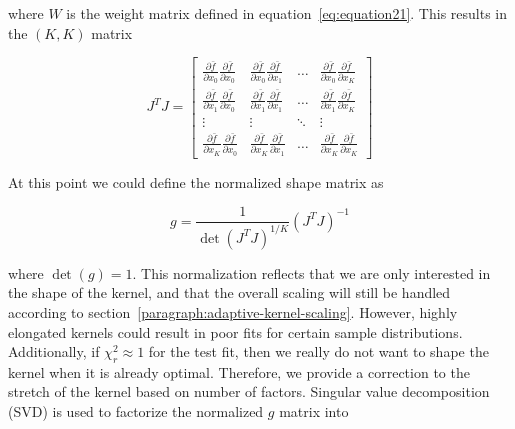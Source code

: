 where $W$ is the weight matrix defined in equation~\ref{eq:equation21}.
This results in the $(K, K)$ matrix

\begin{equation}
    J^T J =
        \begin{bmatrix}
            \frac{\partial \bar{f}}{\partial x_0}
            \frac{\partial \bar{f}}{\partial x_0} &
            \frac{\partial \bar{f}}{\partial x_0}
            \frac{\partial \bar{f}}{\partial x_1} &
            \dots &
            \frac{\partial \bar{f}}{\partial x_0}
            \frac{\partial \bar{f}}{\partial x_K} \\
            \frac{\partial \bar{f}}{\partial x_1}
            \frac{\partial \bar{f}}{\partial x_0} &
            \frac{\partial \bar{f}}{\partial x_1}
            \frac{\partial \bar{f}}{\partial x_1} &
            \dots &
            \frac{\partial \bar{f}}{\partial x_1}
            \frac{\partial \bar{f}}{\partial x_K} \\
            \vdots & \vdots & \ddots & \vdots \\
            \frac{\partial \bar{f}}{\partial x_K}
            \frac{\partial \bar{f}}{\partial x_0} &
            \frac{\partial \bar{f}}{\partial x_K}
            \frac{\partial \bar{f}}{\partial x_1} &
            \dots &
            \frac{\partial \bar{f}}{\partial x_K}
            \frac{\partial \bar{f}}{\partial x_K}
        \end{bmatrix}
    \label{eq:equation51}
\end{equation}

At this point we could define the normalized shape matrix as

\begin{equation}
    g = \frac{1}{\det(J^T J)^{1/K}}(J^T J)^{-1}
    \label{eq:equation52}
\end{equation}

where $\det(g) = 1$.
This normalization reflects that we are only interested in the shape of the
kernel, and that the overall scaling will still be handled according to
section~\ref{paragraph:adaptive-kernel-scaling}.
However, highly elongated kernels could result in poor fits for certain sample
distributions.
Additionally, if $\chi_r^2 \approx 1$ for the test fit, then we really do not
want to shape the kernel when it is already optimal.
Therefore, we provide a correction to the stretch of the kernel based on
number of factors.
Singular value decomposition (SVD) is used to factorize the normalized
$g$ matrix into

